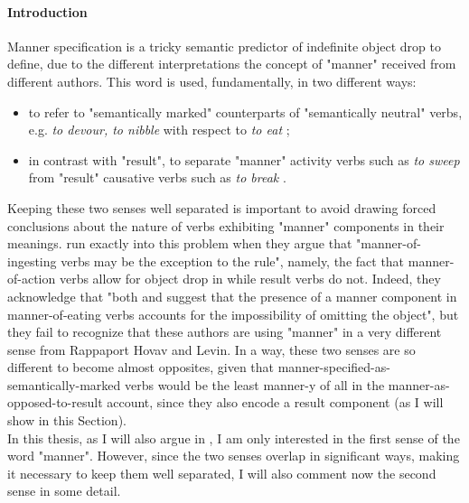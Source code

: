 \paragraph{Introduction}
Manner specification is a tricky semantic predictor of indefinite object drop to define, due to the different interpretations the concept of "manner" received from different authors. This word is used, fundamentally, in two different ways:
\begin{itemize}
    \item to refer to "semantically marked" counterparts of "semantically neutral" verbs, e.g. \textit{to devour, to nibble} with respect to \textit{to eat} \parencite{Naess2007, FellbaumKegl1989taxonomic, Rice1988};
    \item in contrast with "result", to separate "manner" activity verbs such as \textit{to sweep} from "result" causative verbs such as \textit{to break} \parencite{BeaversKoontzGarboden2012, BeaversKoontzGarboden2017, Beavers2013, RappaportLevin1998building, RappaportHovavLevin2005, LevinRappaportHovav2008, RappaportHovavLevin2010, Melchin2019}.
\end{itemize}

Keeping these two senses well separated is important to avoid drawing forced conclusions about the nature of verbs exhibiting "manner" components in their meanings. \textcite[7]{Garcia-VelascoMunoz2002} run exactly into this problem when they argue that "manner-of-ingesting verbs may be the exception to the rule", namely, the fact that manner-of-action verbs allow for object drop in \textcite{RappaportLevin1998building} while result verbs do not. Indeed, they acknowledge that "both \textcite{Rice1988} and \textcite{FellbaumKegl1989taxonomic} suggest that the presence of a manner component in manner-of-eating verbs accounts for the impossibility of omitting the object", but they fail to recognize that these authors are using "manner" in a very different sense from Rappaport Hovav and Levin. In a way, these two senses are so different to become almost opposites, given that manner-specified-as-semantically-marked verbs would be the least manner-y of all in the manner-as-opposed-to-result account, since they also encode a result component (as I will show in this Section).\\
In this thesis, as I will also argue in , I am only interested in the first sense of the word "manner". However, since the two senses overlap in significant ways, making it necessary to keep them well separated, I will also comment now the second sense in some detail.

